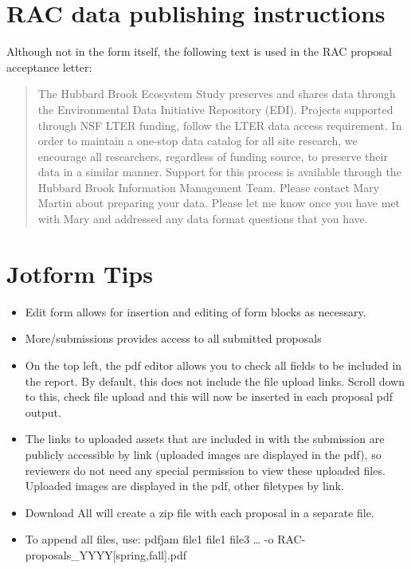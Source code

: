 \documentclass[
  letterpaper,
  DIV=11,
  numbers=noendperiod]{scrreprt}
\begin{document}
\section{RAC data publishing
instructions}\label{rac-data-publishing-instructions}

Although not in the form itself, the following text is used in the RAC
proposal acceptance letter:

\begin{quote}
The Hubbard Brook Ecosystem Study preserves and shares data through the
Environmental Data Initiative Repository (EDI). Projects supported
through NSF LTER funding, follow the LTER data access requirement. In
order to maintain a one-stop data catalog for all site research, we
encourage all researchers, regardless of funding source, to preserve
their data in a similar manner. Support for this process is available
through the Hubbard Brook Information Management Team. Please contact
Mary Martin about preparing your data. Please let me know once you have
met with Mary and addressed any data format questions that you have.
\end{quote}

\section{Jotform Tips}\label{jotform-tips}

\begin{itemize}
\item
  Edit form allows for insertion and editing of form blocks as
  necessary.
\item
  More/submissions provides access to all submitted proposals
\item
  On the top left, the pdf editor allows you to check all fields to be
  included in the report. By default, this does not include the file
  upload links. Scroll down to this, check file upload and this will now
  be inserted in each proposal pdf output.
\item
  The links to uploaded assets that are included in with the submission
  are publicly accessible by link (uploaded images are displayed in the
  pdf), so reviewers do not need any special permission to view these
  uploaded files. Uploaded images are displayed in the pdf, other
  filetypes by link.
\item
  Download All will create a zip file with each proposal in a separate
  file.
\item
  To append all files, use: pdfjam file1 file1 file3 \ldots{} -o
  RAC-proposals\_YYYY{[}spring,fall{]}.pdf
\end{itemize}
\end{document}
